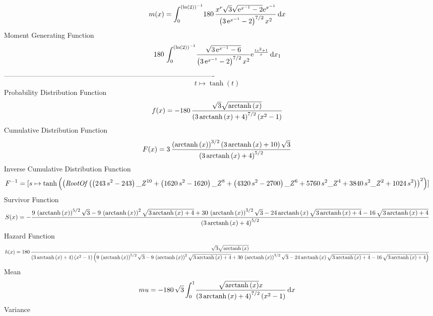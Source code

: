 \documentclass[12pt]{article}
\begin{document}
 $$ m(x) = \int_{0}^{ \left( \ln  \left( 2 \right)  \right) ^{-1}}\!180\,{\frac {
{x}^{r}\sqrt {3}\sqrt {{{\rm e}^{{x}^{-1}}}-2}{{\rm e}^{{x}^{-1}}}}{
 \left( 3\,{{\rm e}^{{x}^{-1}}}-2 \right) ^{7/2}{x}^{2}}}\,{\rm d}x
$$ Moment Generating Function 
 $$180\,\int_{0}^{ \left( \ln  \left( 2 \right)  \right) ^{-1}}\!{\frac {
\sqrt {3\,{{\rm e}^{{x}^{-1}}}-6}}{ \left( 3\,{{\rm e}^{{x}^{-1}}}-2
 \right) ^{7/2}{x}^{2}}{{\rm e}^{{\frac {t{x}^{2}+1}{x}}}}}\,{\rm d}x_
{{1}}
$$-------------------------------------------------------------------------------------------  \\$$t\mapsto \tanh \left( t \right) 
$$Probability Distribution Function 
$$  f(x)=-180\,{\frac {\sqrt {3}\sqrt {{\rm arctanh} \left(x\right)}}{ \left( 3
\,{\rm arctanh} \left(x\right)+4 \right) ^{7/2} \left( {x}^{2}-1
 \right) }}
$$Cumulative Distribution Function  
 $$F(x)=3\,{\frac { \left( {\rm arctanh} \left(x\right) \right) ^{3/2} \left( 
3\,{\rm arctanh} \left(x\right)+10 \right) \sqrt {3}}{ \left( 3\,
{\rm arctanh} \left(x\right)+4 \right) ^{5/2}}}
$$ Inverse Cumulative Distribution Function 
  $$F^{-1} = [s\mapsto \tanh \left(  \left( {\it RootOf} \left(  \left( 243\,{s}^{2
}-243 \right) {{\it \_Z}}^{10}+ \left( 1620\,{s}^{2}-1620 \right) {{
\it \_Z}}^{8}+ \left( 4320\,{s}^{2}-2700 \right) {{\it \_Z}}^{6}+5760
\,{s}^{2}{{\it \_Z}}^{4}+3840\,{s}^{2}{{\it \_Z}}^{2}+1024\,{s}^{2}
 \right)  \right) ^{2} \right) ]
$$Survivor Function 
 $$ S(x)=-{\frac {9\, \left( {\rm arctanh} \left(x\right) \right) ^{5/2}\sqrt {
3}-9\, \left( {\rm arctanh} \left(x\right) \right) ^{2}\sqrt {3\,
{\rm arctanh} \left(x\right)+4}+30\, \left( {\rm arctanh} \left(x
\right) \right) ^{3/2}\sqrt {3}-24\,{\rm arctanh} \left(x\right)\sqrt 
{3\,{\rm arctanh} \left(x\right)+4}-16\,\sqrt {3\,{\rm arctanh} \left(
x\right)+4}}{ \left( 3\,{\rm arctanh} \left(x\right)+4 \right) ^{5/2}}
}
$$ Hazard Function 
 $$ h(x)=180\,{\frac {\sqrt {3}\sqrt {{\rm arctanh} \left(x\right)}}{ \left( 3
\,{\rm arctanh} \left(x\right)+4 \right)  \left( {x}^{2}-1 \right) 
 \left( 9\, \left( {\rm arctanh} \left(x\right) \right) ^{5/2}\sqrt {3
}-9\, \left( {\rm arctanh} \left(x\right) \right) ^{2}\sqrt {3\,
{\rm arctanh} \left(x\right)+4}+30\, \left( {\rm arctanh} \left(x
\right) \right) ^{3/2}\sqrt {3}-24\,{\rm arctanh} \left(x\right)\sqrt 
{3\,{\rm arctanh} \left(x\right)+4}-16\,\sqrt {3\,{\rm arctanh} \left(
x\right)+4} \right) }}
$$Mean 
 $$ mu=-180\,\sqrt {3}\int_{0}^{1}\!{\frac {\sqrt {{\rm arctanh} \left(x
\right)}x}{ \left( 3\,{\rm arctanh} \left(x\right)+4 \right) ^{7/2}
 \left( {x}^{2}-1 \right) }}\,{\rm d}x
$$ Variance 
\end{document}
